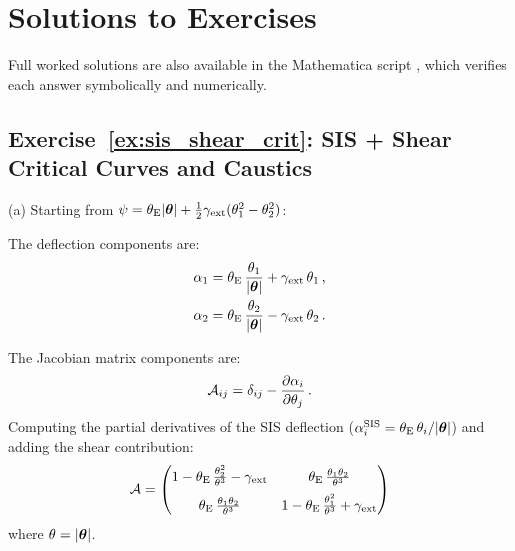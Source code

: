 
\section{Solutions to Exercises}
\label{sec:elliptical_solutions}

\noindent
Full worked solutions are also available in the Mathematica script
,
which verifies each answer symbolically and numerically.

\subsection*{Exercise~\ref{ex:sis_shear_crit}: SIS + Shear Critical Curves and Caustics}

(a) Starting from
$\psi = \theta_{\mathrm{E}}|\boldsymbol{\theta}| + \frac{1}{2}\gamma_{\mathrm{ext}}
(\theta_1^2 - \theta_2^2)$:

The deflection components are:
\begin{align*}
    \alpha_1 &= \theta_{\mathrm{E}}\,\frac{\theta_1}{|\boldsymbol{\theta}|}
    + \gamma_{\mathrm{ext}}\,\theta_1 \,, \\
    \alpha_2 &= \theta_{\mathrm{E}}\,\frac{\theta_2}{|\boldsymbol{\theta}|}
    - \gamma_{\mathrm{ext}}\,\theta_2 \,.
\end{align*}

The Jacobian matrix components are:
\begin{equation*}
    \mathcal{A}_{ij} = \delta_{ij} -
    \frac{\partial\alpha_i}{\partial\theta_j} \,.
\end{equation*}
Computing the partial derivatives of the SIS deflection
($\alpha_i^{\mathrm{SIS}} = \theta_{\mathrm{E}}\,\theta_i/|\boldsymbol{\theta}|$) and
adding the shear contribution:
\begin{equation*}
    \mathcal{A} = \begin{pmatrix}
    1 - \theta_{\mathrm{E}}\,\frac{\theta_2^2}{\theta^3} - \gamma_{\mathrm{ext}}
    & \theta_{\mathrm{E}}\,\frac{\theta_1\theta_2}{\theta^3} \\[6pt]
    \theta_{\mathrm{E}}\,\frac{\theta_1\theta_2}{\theta^3}
    & 1 - \theta_{\mathrm{E}}\,\frac{\theta_1^2}{\theta^3} + \gamma_{\mathrm{ext}}
    \end{pmatrix}
\end{equation*}
where $\theta = |\boldsymbol{\theta}|$.

